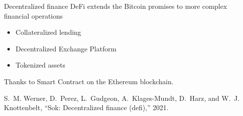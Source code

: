 \documentclass{beamer}
\begin{document}
\begin{frame}{Decentralized finance}
DeFi extends the Bitcoin promises to more complex financial operations 
\begin{itemize}
  \item Collateralized lending
  \item Decentralized Exchange Platform
  \item Tokenized assets
\end{itemize}
\vspace{0.3cm}
Thanks to Smart Contract on the Ethereum blockchain.
\vspace{0.3cm}
\scriptsize
\begin{thebibliography}{1}

S.~M. Werner, D.~Perez, L.~Gudgeon, A.~Klages-Mundt, D.~Harz, and W.~J.
  Knottenbelt, ``Sok: Decentralized finance (defi),'' 2021.

\end{thebibliography}

\end{frame}
\end{document}
